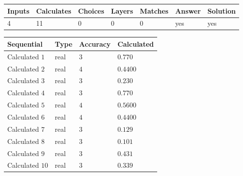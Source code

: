 \documentclass[12pt]{article}
\begin{document}
 
 
\noindent{}
 
 

 
\vspace{0.3in}
   
   
   
   
\noindent\begin{tabular}{|l|l|l|l|l|l|l|}
 \hline
Inputs & Calculates & Choices & Layers & Matches & Answer & Solution \\ \hline
           4  & 
          11  & 
           0
  & 
           0  & 
           0  & 
  yes & 
  yes 
  \\ \hline
 \end{tabular}
   
   
   
   
\noindent{}
   
   
  
  
\noindent\begin{tabular}{|l|l|l|l|}
\hline
 Sequential & Type & Accuracy & Calculated \\ 
\hline
 
 
  Calculated $            1 $ & real & $            3  $ & 
 $ 0.770 $ 
 \\  \hline  
 
 
  Calculated $            2 $ & real & $            4  $ & 
 $ 0.4400 $ 
 \\  \hline  
 
 
  Calculated $            3 $ & real & $            3  $ & 
 $ 0.230 $ 
 \\  \hline  
 
 
  Calculated $            4 $ & real & $            3  $ & 
 $ 0.770 $ 
 \\  \hline  
 
 
  Calculated $            5 $ & real & $            4  $ & 
 $ 0.5600 $ 
 \\  \hline  
 
 
  Calculated $            6 $ & real & $            4  $ & 
 $ 0.4400 $ 
 \\  \hline  
 
 
  Calculated $            7 $ & real & $            3  $ & 
 $ 0.129 $ 
 \\  \hline  
 
 
  Calculated $            8 $ & real & $            3  $ & 
 $ 0.101 $ 
 \\  \hline  
 
 
  Calculated $            9 $ & real & $            3  $ & 
 $ 0.431 $ 
 \\  \hline  
 
 
  Calculated $           10 $ & real & $            3  $ & 
 $ 0.339 $ 
 \\  \hline  
 \end{tabular}
   
\end{document}
